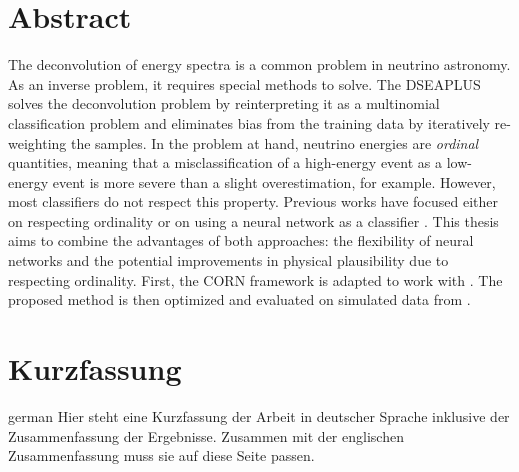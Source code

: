\thispagestyle{plain}

\section*{Abstract}
The deconvolution of energy spectra is a common problem in neutrino astronomy.
As an inverse problem,
  it requires special methods to solve.
The \acf{DSEAPLUS} \cite{dsea_unification}
solves the deconvolution problem
  by reinterpreting it as a multinomial classification problem
and eliminates bias from the training data
  by iteratively re-weighting the samples.
%
In the problem at hand,
  neutrino energies are \emph{ordinal} quantities,
    meaning that a misclassification of a high-energy event as a low-energy event
    is more severe than a slight overestimation,
    for example.
However,
  most classifiers do not respect this property.
Previous works
have focused either
  on respecting ordinality \cite{dsea_jan}
  or on using a neural network as a classifier \cite{dsea_samuel}.
This thesis aims to combine the advantages of both approaches:
  the flexibility of neural networks
  and the potential improvements in physical plausibility
    due to respecting ordinality.
First,
the \ac{CORN} framework \cite{corn} is adapted to work with \dsea{}.
The proposed method is then optimized and evaluated
  on simulated data from \icecube{}.


\section*{Kurzfassung}
\begin{foreignlanguage}{german}
Hier steht eine Kurzfassung der Arbeit in deutscher Sprache inklusive der Zusammenfassung der
Ergebnisse.
Zusammen mit der englischen Zusammenfassung muss sie auf diese Seite passen.

\blindtext[1]
\end{foreignlanguage}
